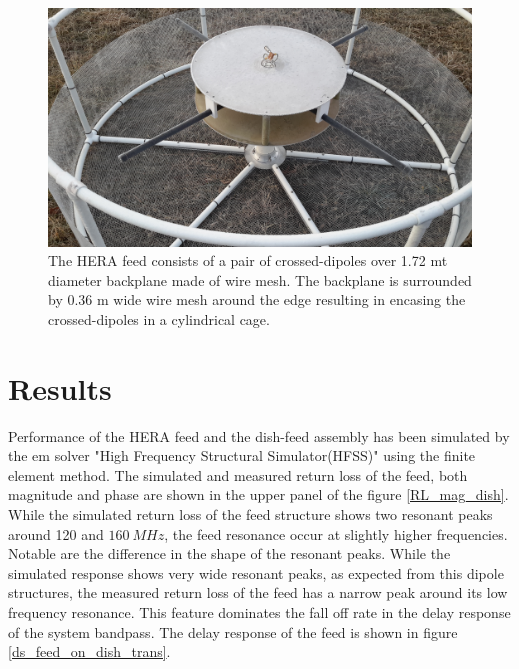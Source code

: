 \documentclass[twocolumn]{emulateapj}
\newcommand{\vis}{{V}}
\begin{document}
    \begin{figure}
    \centering
    \includegraphics[trim={2cm 10cm 20cm 5cm},clip, totalheight=0.3\textheight]{plots/herafeed.jpg}
    \vspace{1.0 em}
    \caption{The HERA feed consists of a pair of crossed-dipoles over 1.72 mt diameter backplane made of wire mesh. The backplane is surrounded by 0.36 m wide wire mesh around the edge resulting in encasing the crossed-dipoles in a cylindrical cage.}
    \label{fig:herafeed}
    \end{figure}
    
    
    \section{\textbf{Results}}
    
    Performance of the HERA feed and the dish-feed assembly has been simulated by
    the em solver "High Frequency Structural Simulator(HFSS)" using the finite
    element method.  The simulated and measured return loss of the feed, both
    magnitude and phase are shown in the upper panel of the figure
    \ref{RL_mag_dish}. While the simulated return loss of the feed structure shows
    two resonant peaks around 120 and $160~MHz$, the feed resonance occur at
    slightly higher frequencies. Notable are the difference in the shape of the
    resonant peaks. While the simulated response shows very wide resonant peaks, as
    expected from this dipole structures, the measured return loss of the feed has
    a narrow peak around its low frequency resonance. This feature dominates the
    fall off rate in the delay response of the system bandpass. The delay response
    of the feed is shown in figure \ref{ds_feed_on_dish_trans}. 
    
\end{document}
